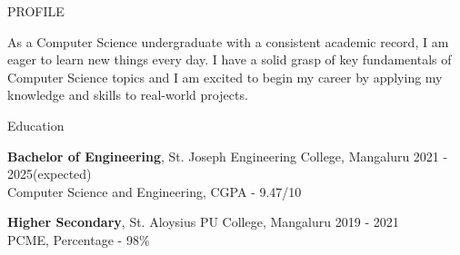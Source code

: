 \documentclass{resume} %
\begin{document}

\begin{rSection}{PROFILE}

{As a Computer Science undergraduate with a consistent academic record,
 I am eager to learn new things every day. 
 I have a solid grasp of key fundamentals of Computer Science topics and 
 I am excited to begin my career by applying my knowledge and skills to 
 real-world projects.
}


\end{rSection}

\begin{rSection}{Education}

{\bf Bachelor of Engineering}, St. Joseph Engineering College, Mangaluru \hfill {2021 - 2025(expected)}\\
Computer Science and Engineering, CGPA - 9.47/10

{\bf Higher Secondary}, St. Aloysius PU College, Mangaluru \hfill {2019 - 2021}\\
PCME, Percentage - 98\%



\end{rSection}
\end{document}
